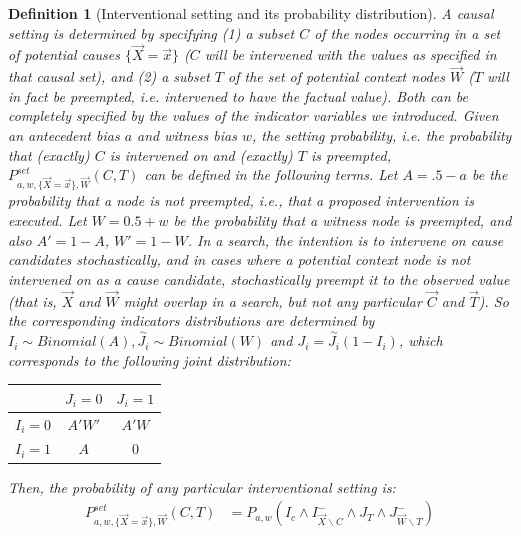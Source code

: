 \documentclass{article}
\newtheorem{definition}{Definition}
\begin{document}
\begin{definition}[Interventional setting and its probability distribution] \label{def:interventional_setting} A causal setting is determined by specifying (1) a subset \(C\) of the nodes occurring in a set of potential causes \(\{\vec{X} = \vec{x}\}\) ($C$  will be intervened with the values as specified in that causal set), and (2) a subset \(T\) of the set of potential context nodes \(\vec{W}\) ($T$ will in fact be preempted, i.e.\! intervened to have the factual value). Both can be completely specified by the values of the indicator variables we introduced. Given an antecedent bias \(a\) and witness bias \(w\), the setting probability, i.e. the probability that (exactly) \(C\) is intervened on and (exactly) \(T\) is preempted, $P^{\mathit{set}}_{a,w, \{\vec{X}=\vec {x}\}, \vec{W}}(C, T)$ can be defined in the following terms. Let $A = .5-a$ be the probability that a node is not preempted, i.e., that a proposed intervention is executed. Let $W = 0.5 + w$ be the probability that a witness node is preempted, and also $A' = 1-A$, $W' = 1-W$. In a search, the intention is to intervene on cause candidates stochastically, and in cases where a potential context node is not intervened on as a cause candidate, stochastically preempt it to the observed value (that is, $\vec{X}$ and $\vec{W}$ might overlap in a search, but not any particular $\vec{C}$ and $\vec{T}$). So the corresponding indicators distributions are determined by $I_i \sim Binomial(A), \overset{\sim}{J_i} \sim Binomial(W)$ and $J_i = \overset{\sim}{J_i}(1-I_i)$, which corresponds to the following joint distribution:
\begin{center}
\begin{tabular}{lcc}
\toprule
 & $J_i = 0$ & $J_i = 1$ \\
\midrule
$I_i = 0$ & $A'W'$ & $A'W$ \\
$I_i = 1$ & $A$ & $0$ \\
\bottomrule
\end{tabular}
\end{center}
Then, the probability of any particular interventional setting is:
\begin{align}\label{eq:psetawct}
P^{\mathit{set}}_{a,w, \{\vec{X}=\vec {x}\}, \vec{W}}(C,T) & = P_{a, w}\left(I_c \wedge I^-_{\vec{X} \backslash C}  \wedge  J_T  \wedge J^-_{\vec{W} \backslash T} \right)   %
\end{align}
\noindent 



        
\end{definition}
\end{document}

